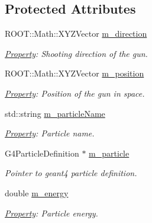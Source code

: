 \subsection*{Protected Attributes}
\begin{DoxyCompactItemize}
\item 
ROOT::Math::XYZVector \hyperlink{class_d_d4hep_1_1_simulation_1_1_geant4_particle_generator_a2e9c3184ff8999d4e55e3158e3b43727}{m\_\-direction}
\begin{DoxyCompactList}\small\item\em \hyperlink{class_d_d4hep_1_1_property}{Property}: Shooting direction of the gun. \item\end{DoxyCompactList}\item 
ROOT::Math::XYZVector \hyperlink{class_d_d4hep_1_1_simulation_1_1_geant4_particle_generator_a6ee07c5b63244214bb70499dd66eb26a}{m\_\-position}
\begin{DoxyCompactList}\small\item\em \hyperlink{class_d_d4hep_1_1_property}{Property}: Position of the gun in space. \item\end{DoxyCompactList}\item 
std::string \hyperlink{class_d_d4hep_1_1_simulation_1_1_geant4_particle_generator_ae7181a20c8374bee76cd7d29ea0e7dc7}{m\_\-particleName}
\begin{DoxyCompactList}\small\item\em \hyperlink{class_d_d4hep_1_1_property}{Property}: Particle name. \item\end{DoxyCompactList}\item 
G4ParticleDefinition $\ast$ \hyperlink{class_d_d4hep_1_1_simulation_1_1_geant4_particle_generator_a9f974a1df5025bb1ff4f65d6ed73bbd1}{m\_\-particle}
\begin{DoxyCompactList}\small\item\em Pointer to geant4 particle definition. \item\end{DoxyCompactList}\item 
double \hyperlink{class_d_d4hep_1_1_simulation_1_1_geant4_particle_generator_a0177e67af8736780fa0e401d598a792f}{m\_\-energy}
\begin{DoxyCompactList}\small\item\em \hyperlink{class_d_d4hep_1_1_property}{Property}: Particle energy. \item\end{DoxyCompactList}\item 

\end{DoxyCompactItemize}
